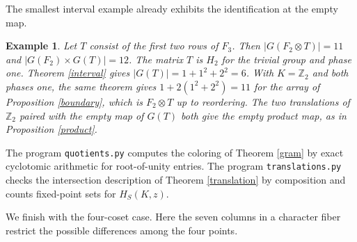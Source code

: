 \documentclass[11pt,a4paper]{article}
\newtheorem{ex}[thm]{Example}
\begin{document}
The smallest interval example already exhibits the identification at the empty map.

\begin{ex}\label{eleven}
Let $T$ consist of the first two rows of $F_3$. Then $|G(F_2\otimes T)|=11$ and $|G(F_2)\times G(T)|=12$. The matrix $T$ is $H_2$ for the trivial group and phase one. Theorem \ref{interval} gives $|G(T)|=1+1^2+2^2=6$. With $K=\mathbb Z_2$ and both phases one, the same theorem gives $1+2(1^2+2^2)=11$ for the array of Proposition \ref{boundary}, which is $F_2\otimes T$ up to reordering. The two translations of $\mathbb Z_2$ paired with the empty map of $G(T)$ both give the empty product map, as in Proposition \ref{product}.
\end{ex}

The program \texttt{quotients.py} computes the coloring of Theorem \ref{gram} by exact cyclotomic arithmetic for root-of-unity entries. The program \texttt{translations.py} checks the intersection description of Theorem \ref{translation} by composition and counts fixed-point sets for $H_S(K,z)$.

We finish with the four-coset case. Here the seven columns in a character fiber restrict the possible differences among the four points.
\end{document}
